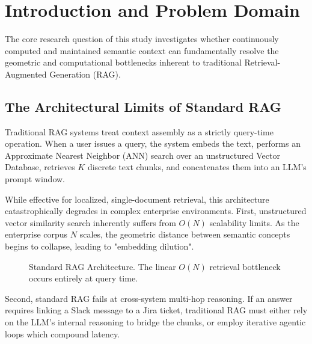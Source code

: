 
\section{Introduction and Problem Domain}
\label{sec:intro}
The core research question of this study investigates whether continuously computed and maintained semantic context can fundamentally resolve the geometric and computational bottlenecks inherent to traditional Retrieval-Augmented Generation (RAG).

\subsection{The Architectural Limits of Standard RAG}
Traditional RAG systems treat context assembly as a strictly query-time operation. When a user issues a query, the system embeds the text, performs an Approximate Nearest Neighbor (ANN) search over an unstructured Vector Database, retrieves $K$ discrete text chunks, and concatenates them into an LLM's prompt window. 

While effective for localized, single-document retrieval, this architecture catastrophically degrades in complex enterprise environments. First, unstructured vector similarity search inherently suffers from $O(N)$ scalability limits. As the enterprise corpus $N$ scales, the geometric distance between semantic concepts begins to collapse, leading to "embedding dilution".

\begin{figure}[htbp]
\centering
{}
\caption{Standard RAG Architecture. The linear $O(N)$ retrieval bottleneck occurs entirely at query time.}
\label{fig:rag_issues}
\end{figure}

Second, standard RAG fails at cross-system multi-hop reasoning. If an answer requires linking a Slack message to a Jira ticket, traditional RAG must either rely on the LLM's internal reasoning to bridge the chunks, or employ iterative agentic loops which compound latency.

